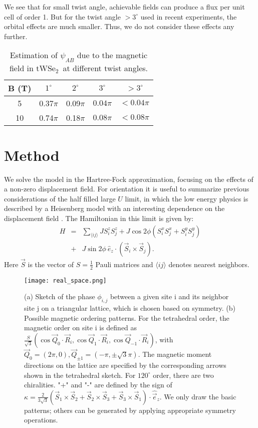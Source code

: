 \documentclass[%
reprint,
superscriptaddress,
twocolumn,
 amsmath,amssymb,
 aps,
 prb,
]{revtex4-2}
\newcommand{\twsetwo}{tWSe$_2$}
\begin{document}
We see that for small twist angle, achievable fields can produce a flux per unit cell of order 1. But for the twist angle $>3^\circ$ used in recent experiments, the orbital effects are much smaller. 
Thus, we do not consider these effects any further.

\begin{table}[ht]
\caption{\label{table}%
Estimation of $\psi_{AB}$ due to the magnetic field in \twsetwo~at different twist angles.}
\begin{ruledtabular}
\begin{tabular}{ccccc}
B (T) & $1^{\circ}$ & $2^{\circ}$ & $3^{\circ}$& $>3^{\circ}$\\ \hline
5 & 0.37$\pi$ & 0.09$\pi$ & $0.04\pi$ & $<0.04\pi$\\ 
10 & 0.74$\pi$ & 0.18$\pi$& $0.08\pi$ & $<0.08\pi$\\
\end{tabular}
\end{ruledtabular}
\end{table}


\section{Method\label{sec:Method}}
We solve the model in the Hartree-Fock approximation, focusing on the effects of a non-zero displacement field.  For orientation it is useful to summarize previous considerations of the half filled large $U$ limit, in which the low energy physics is described by a Heisenberg model with an interesting dependence on the displacement field \cite{PhysRevResearch.2.033087}. The Hamiltonian in this limit is given by:
\begin{eqnarray}
    H &=& \sum_{\langle ij \rangle}JS_i^zS_j^z+J\cos2\phi\left(S_i^xS_j^x+S_i^yS_j^y\right)\nonumber\\
    &+& J\sin2\phi~ \hat{ e}_z\cdot ( \vec{S}_i\times \vec{S}_j ).
    \label{Heisenberg}
\end{eqnarray}
Here $\vec{S}$ is the vector of $S=\frac{1}{2}$ Pauli matrices and $\langle ij \rangle$ denotes nearest neighbors. 

\begin{figure}[t]
  \texttt{[image: real\_space.png]}
  \caption{(a) Sketch of the phase $\phi_{i,j}$ between a given site i and its neighbor site j on a triangular lattice, which is chosen based on symmetry. 
  (b) Possible  magnetic ordering patterns. For the tetrahedral order, the magnetic order on site i is defined as $\frac{S}{\sqrt{3}}(\cos \vec{Q}_0\cdot \vec{R}_i,\cos \vec{Q}_1\cdot \vec{R}_i,\cos \vec{Q}_{-1}\cdot \vec{R}_i)$, with
$\vec{Q}_0=(2\pi,0),\vec{Q}_{\pm1}=(-\pi,\pm\sqrt{3}\pi)$. The magnetic moment directions on the lattice are specified by the corresponding arrows shown in the tetrahedral sketch. For $120^{\circ}$ order, there are two chiralities. "+" and "-" are defined by the sign of  $\kappa=\frac{2}{3 \sqrt{3}}(\vec{S}_1 \times \vec{S}_2+\vec{S}_2 \times\vec{S}_3+\vec{S}_3 \times \vec{S}_1 )\cdot\hat{\vec e}_z$. We only draw the basic patterns; others can be generated by applying appropriate symmetry operations.}
  \label{fig:phi}
\end{figure}
\end{document}
